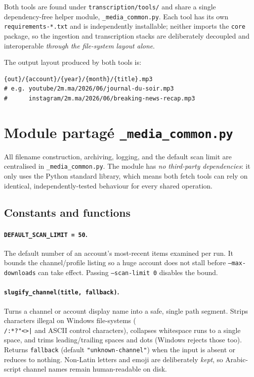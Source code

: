 \documentclass[11pt,a4paper]{report}
\newcommand{\code}[1]{\texttt{\small #1}}
\begin{document}
Both tools are found under \texttt{transcription/tools/} and share a single
dependency-free helper module, \texttt{\_media\_common.py}.  Each tool has its own
\texttt{requirements-*.txt} and is independently installable; neither imports the
\texttt{core} package, so the ingestion and transcription stacks are deliberately
decoupled and interoperable \emph{through the file-system layout alone}.

\noindent The output layout produced by both tools is:
\begin{lstlisting}[style=sh, numbers=none]
{out}/{account}/{year}/{month}/{title}.mp3
# e.g. youtube/2m.ma/2026/06/journal-du-soir.mp3
#      instagram/2m.ma/2026/06/breaking-news-recap.mp3
\end{lstlisting}

\section{Module partagé \texttt{\_media\_common.py}}

All filename construction, archiving, logging, and the default scan limit are
centralised in \texttt{\_media\_common.py}.  The module has \emph{no third-party
dependencies}: it only uses the Python standard library, which means both fetch
tools can rely on identical, independently-tested behaviour for every shared
operation.

\subsection*{Constants and functions}

\paragraph{\texttt{DEFAULT\_SCAN\_LIMIT = 50}.}
The default number of an account's most-recent items examined per run.  It bounds
the channel/profile listing so a huge account does not stall before
\code{--max-downloads} can take effect.  Passing \code{--scan-limit 0} disables
the bound.

\paragraph{\texttt{slugify\_channel(title, fallback)}.}
Turns a channel or account display name into a safe, single path segment.
Strips characters illegal on Windows file-systems (\code{\\/:*?"<>|} and ASCII
control characters), collapses whitespace runs to a single space, and trims
leading/trailing spaces and dots (Windows rejects those too).  Returns
\code{fallback} (default \code{"unknown-channel"}) when the input is absent or
reduces to nothing.  Non-Latin letters and emoji are deliberately \emph{kept}, so
Arabic-script channel names remain human-readable on disk.
\end{document}
